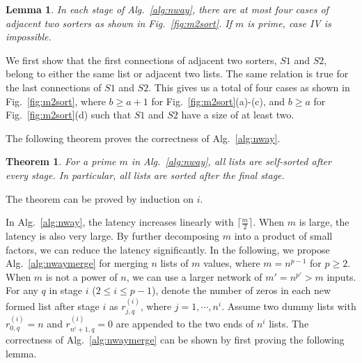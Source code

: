 \documentclass[10pt,journal,cspaper,compsoc]{IEEEtran}
\newtheorem{thm}{Theorem}[section]
\newtheorem{lemma}{Lemma}[section]
\begin{document}
\begin{lemma}
  In each stage of Alg.~\ref{alg:nway}, there are at most four cases of adjacent two sorters as shown in Fig.~\ref{fig:m2sort}. If $m$ is prime, case IV is impossible.
\label{lm:sorter4case}
\end{lemma}
We first show that the first connections of adjacent two sorters, $S1$ and $S2$, belong to either the same list or adjacent two lists. The same relation is true for the last connections of $S1$ and $S2$. This gives us a total of four cases as shown in Fig.~\ref{fig:m2sort}, where $b\ge a+1$ for Fig.~\ref{fig:m2sort}(a)-(c), and $b\ge a$ for Fig.~\ref{fig:m2sort}(d) such that $S1$ and $S2$ have a size of at least two.

The following theorem proves the correctness of Alg.~\ref{alg:nway}.
\begin{thm}
  For a prime $m$ in Alg.~\ref{alg:nway}, all lists are self-sorted after every stage. In particular, all lists are sorted after the final stage.
\label{thm:groupsort}
\end{thm}
The theorem can be proved by induction on $i$.




In Alg.~\ref{alg:nway}, the latency increases linearly with $\lceil \frac{m}{2}\rceil$. When $m$ is large, the latency is also very large. By further decomposing $m$ into a product of small factors, we can reduce the latency significantly.
In the following, we propose Alg.~\ref{alg:nwaymerge} for merging $n$ lists of $m$ values, where $m=n^{p-1}$ for $p \ge 2$. When $m$ is not a power of $n$, we can use a larger network of $m' = n^{p'} > m$ inputs.
For any $q$ in stage $i$ ($2\le i \le p-1$), denote the number of zeros in each new formed list after stage $i$ as $r^{(i)}_{j,q}$, where $j=1,\cdots,n^i$. Assume two dummy lists with $r^{(i)}_{0,q} = n$ and $r^{(i)}_{n^i+1,q} = 0$ are appended to the two ends of $n^i$ lists.
The correctness of Alg.~\ref{alg:nwaymerge} can be shown by first proving the following lemma.
\end{document}
